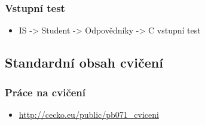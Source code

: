 \begin{frame}
	\frametitle{Vstupní test}
	\begin{itemize}
		\item{IS -> Student -> Odpovědníky -> C vstupní test}
	\end{itemize}
\end{frame}

\subsection{Standardní obsah cvičení}

\begin{frame}
	\frametitle{Práce na cvičení}
	\begin{itemize}
		\item{\href{http://cecko.eu/public/pb071\_cviceni}{http://cecko.eu/public/pb071\_cviceni}}
	\end{itemize}
\end{frame}




